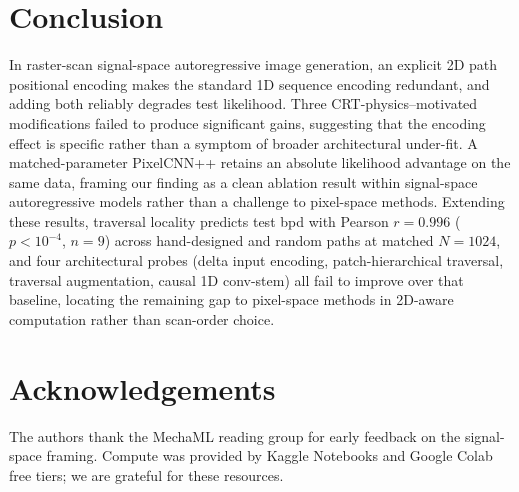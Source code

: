 \documentclass[conference]{IEEEtran}
\begin{document}
\section{Conclusion}

In raster-scan signal-space autoregressive image generation, an
explicit 2D path positional encoding makes the standard 1D sequence
encoding redundant, and adding both reliably degrades test
likelihood. Three CRT-physics--motivated modifications failed to
produce significant gains, suggesting that the encoding effect is
specific rather than a symptom of broader architectural under-fit.
A matched-parameter PixelCNN++ retains an absolute likelihood
advantage on the same data, framing our finding as a clean ablation
result within signal-space autoregressive models rather than a
challenge to pixel-space methods.
Extending these results, traversal locality predicts test bpd with
Pearson $r=0.996$ ($p<10^{-4}$, $n{=}9$) across hand-designed and
random paths at matched $N{=}1024$, and four architectural probes
(delta input encoding, patch-hierarchical traversal, traversal
augmentation, causal 1D conv-stem) all fail to improve over that
baseline, locating the remaining gap to pixel-space methods in
2D-aware computation rather than scan-order choice.

\section*{Acknowledgements}

The authors thank the MechaML reading group for early feedback on
the signal-space framing. Compute was provided by Kaggle Notebooks
and Google Colab free tiers; we are grateful for these resources.
\end{document}
